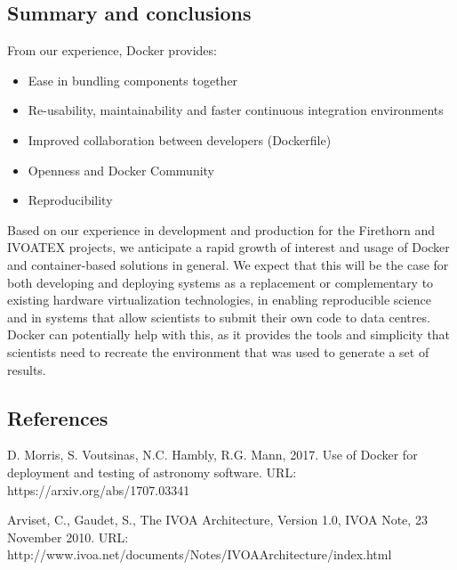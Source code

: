\documentclass[final]{beamer}
\begin{document}
\begin{frame}[t]
\begin{multicols}{3}
\section{Summary and conclusions}

From our experience, Docker provides:

\begin{itemize}
  \item Ease in bundling components together
  \item Re-usability, maintainability and faster continuous integration environments 
  \item  Improved collaboration between developers (Dockerfile)
  \item  Openness and Docker Community
  \item  Reproducibility
\end{itemize}


Based on our experience in development and production for the Firethorn and IVOATEX projects, we anticipate a rapid growth of interest and usage of Docker and container-based solutions in general. We expect that this will be the case for both developing and deploying systems as a replacement or complementary to existing hardware virtualization technologies, in enabling reproducible science and in systems that allow scientists to submit their own code to data centres. Docker can potentially help with this, as it provides the tools and simplicity that scientists need to recreate the environment that was used to generate a set of results. 



\subsection{References}

  \begin{thebibliography}{1}

   D. Morris, S. Voutsinas, N.C. Hambly, R.G. Mann, 2017. 
  Use of Docker for deployment and testing of astronomy software. URL: https://arxiv.org/abs/1707.03341

   Arviset, C., Gaudet, S., The IVOA Architecture, Version 1.0, IVOA Note, 23 November 2010. URL: http://www.ivoa.net/documents/Notes/IVOAArchitecture/index.html


\end{thebibliography}
\end{multicols}
\end{frame}
\end{document}
